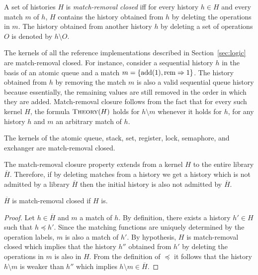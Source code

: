A set of histories $H$ is \emph{match-removal closed} iff for every history
$h\in H$ and every match $m$ of $h$, $H$ contains the history obtained from $h$
by deleting the operations in $m$. The history obtained from another history
$h$ by deleting a set of operations $O$ is denoted by $h \setminus O$.

The kernels of all the reference implementations described in
Section~\ref{sec:logic} are match-removal closed. For instance, consider a
sequential history $h$ in the basis of an atomic queue and a match $m={\{ 
\text{add}(1), \text{rem}\Rightarrow 1  \}}$. The history obtained from $h$ by
removing the match $m$ is also a valid sequential queue history because
essentially, the remaining values are still removed in the order in which they
are added. Match-removal closure follows from the fact that for every such kernel 
$H$, the formula $\textsc{Theory}(H)$ holds for $h\setminus m$ whenever it holds for $h$,
for any history $h$ and $m$ an arbitrary match of $h$.

\begin{theorem}
The kernels of the atomic queue, stack, set, register, lock, semaphore, and exchanger are 
match-removal closed.
\end{theorem}

The match-removal closure property extends from a kernel $H$ to the entire
library $\overline{H}$. Therefore, if by deleting matches from a history we get
a history which is not admitted by a library $\overline{H}$ then the initial
history is also not admitted by $\overline{H}$.

\begin{theorem}
  \label{th:match_closure}

  $\overline{H}$ is match-removal closed if $H$ is.

\end{theorem}

\begin{proof}

  Let $h\in \overline{H}$ and $m$ a match of $h$. By definition, there exists a
  history $h'\in H$ such that $h\preceq h'$. 
  Since the matching functions are uniquely determined by the operation labels, 
  $m$ is also a match of $h'$. By hypothesis, $H$ is match-removal
  closed which implies that the history $h''$ obtained from $h'$ by deleting
  the operations in $m$ is also in $H$. From the definition of $\preceq$ it
  follows that the history $h\setminus m$ is weaker than $h''$ which implies
  $h\setminus m\in \overline{H}$.
\end{proof}

